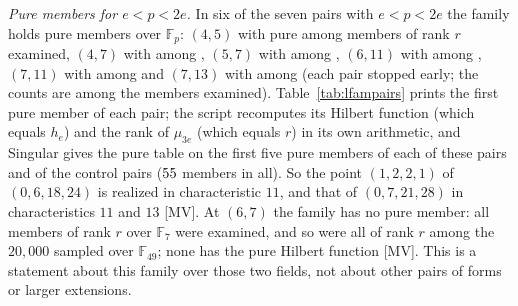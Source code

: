 \documentclass[11pt]{article}
\theoremstyle{definition}
\theoremstyle{remark}
\newcommand{\F}{\mathbb{F}}
\begin{document}
\emph{Pure members for $e<p<2e$.} In six of the seven pairs with $e<p<2e$ the family holds pure members over $\F_p$: $(4,5)$ with \nlfFourFivePure{} pure among \nlfFourFiveExamined{} members of rank $r$ examined, $(4,7)$ with \nlfFourSevenPure{} among \nlfFourSevenExamined{}, $(5,7)$ with \nlfFiveSevenPure{} among \nlfFiveSevenExamined{}, $(6,11)$ with \nlfSixElevenPure{} among \nlfSixElevenExamined{}, $(7,11)$ with \nlfSevenElevenPure{} among \nlfSevenElevenExamined{} and $(7,13)$ with \nlfSevenThirteenPure{} among \nlfSevenThirteenExamined{} (each pair stopped early; the counts are among the members examined). Table~\ref{tab:lfampairs} prints the first pure member of each pair; the script recomputes its Hilbert function (which equals $h_e$) and the rank of $\mu_{3e}$ (which equals $r$) in its own arithmetic, and Singular gives the pure table on the first five pure members of each of these pairs and of the control pairs ($55$ members in all). So the point $(1,2,2,1)$ of $(0,6,18,24)$ is realized in characteristic $11$, and that of $(0,7,21,28)$ in characteristics $11$ and $13$ [MV]. At $(6,7)$ the family has no pure member: all \nlfSixSevenRankR{} members of rank $r$ over $\F_7$ were examined, and so were all \nlfYSixSevenRankR{} of rank $r$ among the $20{,}000$ sampled over $\F_{49}$; none has the pure Hilbert function [MV]. This is a statement about this family over those two fields, not about other pairs of forms or larger extensions.

\begin{table}[htbp]
\centering\footnotesize

\caption{The first pure member of the linear family for each pair $(e,p)$ with $e<p<2e$ where the family holds one: the parameters $(a,b,c,d)$ of $L_e$, the forms over $\F_p$ (coefficients of least absolute value), the length of $U/(Uf+Ug)$ and its Betti table, equal to $(1,2,2,1)$ on $(0,e,3e,4e)$ in the exact library and in Singular; the script recomputes the Hilbert function and the rank of $\mu_{3e}$ of each printed pair.}
\label{tab:lfampairs}
\end{table}
\end{document}
